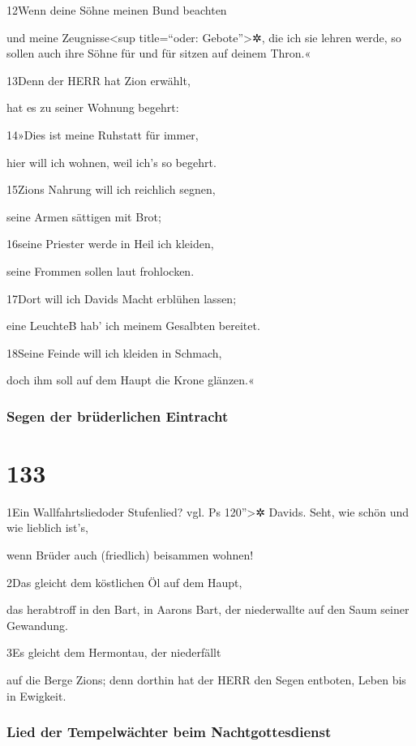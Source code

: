 12Wenn deine Söhne meinen Bund beachten

und meine Zeugnisse\textless sup title=``oder: Gebote''\textgreater✲,
die ich sie lehren werde, so sollen auch ihre Söhne für und für sitzen
auf deinem Thron.«

13Denn der HERR hat Zion erwählt,

hat es zu seiner Wohnung begehrt:

14»Dies ist meine Ruhstatt für immer,

hier will ich wohnen, weil ich's so begehrt.

15Zions Nahrung will ich reichlich segnen,

seine Armen sättigen mit Brot;

16seine Priester werde in Heil ich kleiden,

seine Frommen sollen laut frohlocken.

17Dort will ich Davids Macht erblühen lassen;

eine Leuchte{B} hab' ich meinem Gesalbten bereitet.

18Seine Feinde will ich kleiden in Schmach,

doch ihm soll auf dem Haupt die Krone glänzen.«

\hypertarget{segen-der-bruxfcderlichen-eintracht}{%
\subsubsection{Segen der brüderlichen
Eintracht}\label{segen-der-bruxfcderlichen-eintracht}}

\hypertarget{section-132}{%
\section{133}\label{section-132}}

1Ein Wallfahrtsliedoder Stufenlied? vgl. Ps 120''\textgreater✲ Davids.
Seht, wie schön und wie lieblich ist's,

wenn Brüder auch (friedlich) beisammen wohnen!

2Das gleicht dem köstlichen Öl auf dem Haupt,

das herabtroff in den Bart, in Aarons Bart, der niederwallte auf den
Saum seiner Gewandung.

3Es gleicht dem Hermontau, der niederfällt

auf die Berge Zions; denn dorthin hat der HERR den Segen entboten, Leben
bis in Ewigkeit.

\hypertarget{lied-der-tempelwuxe4chter-beim-nachtgottesdienst}{%
\subsubsection{Lied der Tempelwächter beim
Nachtgottesdienst}\label{lied-der-tempelwuxe4chter-beim-nachtgottesdienst}}

